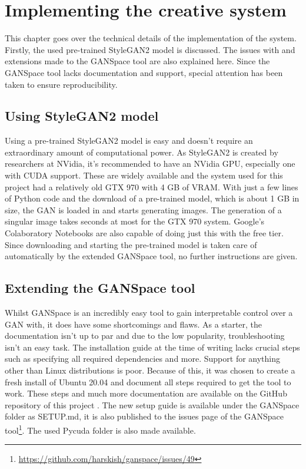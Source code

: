 \chapter{Implementing the creative system}
\label{ch:implementation}


This chapter goes over the technical details of the implementation of the system.
Firstly, the used pre-trained StyleGAN2 model \citep{stylegan2} is discussed. 
The issues with and extensions made to the GANSpace tool \citep{ganspace} are also explained here.
Since the GANSpace tool lacks documentation and support, special attention has been taken to ensure reproducibility.

\section{Using StyleGAN2 model}
\label{sec:sytelgan2_implement}

Using a pre-trained StyleGAN2 model is easy and doesn't require an extraordinary amount of computational power.
As StyleGAN2 is created by researchers at NVidia, it's recommended to have an NVidia GPU, especially one with CUDA support.
These are widely available and the system used for this project had a relatively old GTX 970 with 4 GB of VRAM.
With just a few lines of Python code and the download of a pre-trained model, which is about 1 GB in size, the GAN is loaded in and starts generating images.
The generation of a singular image takes seconds at most for the GTX 970 system.
Google's Colaboratory Notebooks are also capable of doing just this with the free tier.
Since downloading and starting the pre-trained model is taken care of automatically by the extended GANSpace tool, no further instructions are given.

\section{Extending the GANSpace tool}
\label{sec:GANSpace_implement}

Whilst GANSpace is an incredibly easy tool to gain interpretable control over a GAN with, it does have some shortcomings and flaws.
As a starter, the documentation isn't up to par and due to the low popularity, troubleshooting isn't an easy task.
The installation guide at the time of writing lacks crucial steps such as specifying all required dependencies and more.
Support for anything other than Linux distributions is poor.
Because of this, it was chosen to create a fresh install of Ubuntu 20.04 and document all steps required to get the tool to work.
These steps and much more documentation are available on the GitHub repository of this project \citep{github_project}.
The new setup guide is available under the GANSpace folder as SETUP.md, it is also published to the issues page of the GANSpace tool\footnote{\url{https://github.com/harskish/ganspace/issues/49}}. The used Pycuda folder is also made available.

